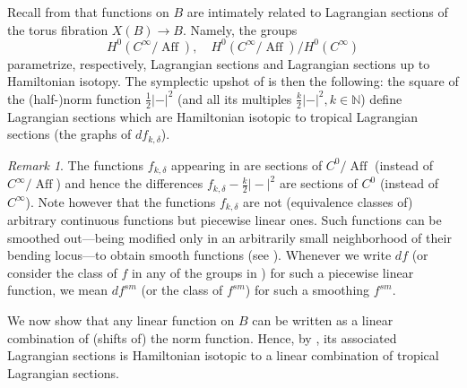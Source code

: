 \documentclass[10pt]{amsart}
\theoremstyle{definition}
\theoremstyle{remark}
\newtheorem{remark}[thm]{Remark}
\def\N{\mathbb{N}}
\DeclareMathOperator{\Aff}{Aff}
\begin{document}
Recall from  that functions on $B$ are intimately related to Lagrangian sections of the torus fibration $X(B) \to B$.
Namely, the groups
\begin{equation}\label{eq:sectionsandsectionsuptoham}
    H^0(C^\infty/\Aff),\quad H^0(C^\infty/\Aff)/H^0(C^\infty)
\end{equation}
parametrize, respectively, Lagrangian sections and Lagrangian sections up to Hamiltonian isotopy.
The symplectic upshot of  is then the following: the square of the (half-)norm function $\frac{1}{2}|-|^2$ (and all its multiples $\frac{k}{2}|-|^2, k\in \N$) define Lagrangian sections which are Hamiltonian isotopic to tropical Lagrangian sections (the graphs of $df_{k,\delta}$).
\begin{remark}
    The functions $f_{k,\delta}$ appearing in  are sections of $C^0/\Aff$ (instead of $C^\infty/\Aff$) and hence the differences $f_{k,\delta} - \frac{k}{2}\vert-\vert^2$ are  sections of $C^0$ (instead of $C^\infty$). 
    Note however that the functions $f_{k,\delta}$ are not (equivalence classes of) arbitrary continuous functions but piecewise linear ones.
    Such functions can be smoothed out---being modified only in an arbitrarily small neighborhood of their bending locus---to obtain smooth functions (see \cite[Section 3.2]{hicks2020tropical}).
    Whenever we write $df$ (or consider the class of $f$ in any of the groups in ) for such a piecewise linear function, we mean $df^{sm}$ (or the class of $f^{sm}$) for such a smoothing $f^{sm}$.
\end{remark}
We now show that any linear function on $B$ can be written as a linear combination of (shifts of) the norm function.
Hence, by , its associated Lagrangian sections is Hamiltonian isotopic to a linear combination of tropical Lagrangian sections.
\end{document}
